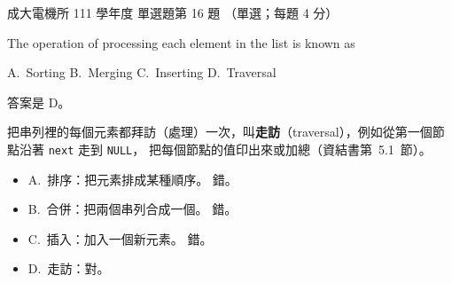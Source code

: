 \begin{pastexam}[label={px:ncku-111-ee-ds-16}]{成大電機所 111 學年度 單選題第 16 題}
（單選；每題 4 分）

The operation of processing each element in the list is known as

A.~Sorting \qquad B.~Merging \qquad C.~Inserting \qquad D.~Traversal
\end{pastexam}

\begin{pastsoln}
答案是 D。

把串列裡的每個元素都拜訪（處理）一次，叫\textbf{走訪}（traversal），例如從第一個節點沿著 \texttt{next} 走到 \texttt{NULL}，
把每個節點的值印出來或加總（資結書第~5.1~節）。
\begin{itemize}
\item A.~排序：把元素排成某種順序。 錯。
\item B.~合併：把兩個串列合成一個。 錯。
\item C.~插入：加入一個新元素。 錯。
\item D.~走訪：對。
\end{itemize}
\end{pastsoln}
